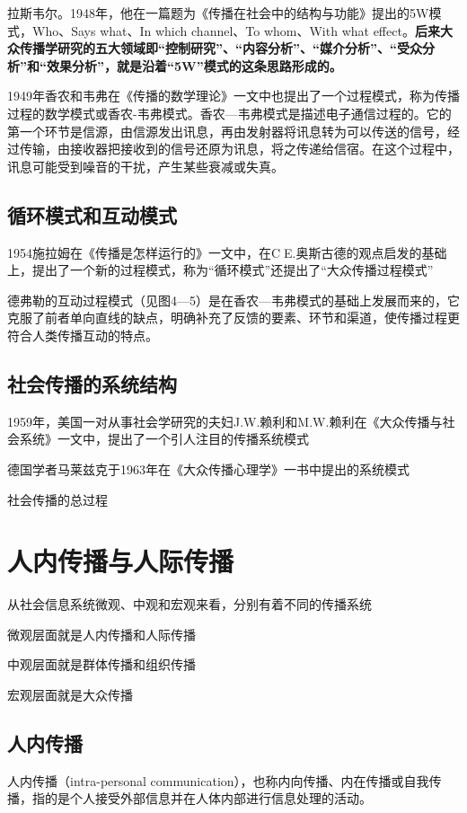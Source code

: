 \documentclass[UTF8,12pt]{ctexart}
\numberwithin{equation}{section} %
\numberwithin{figure}{section}
\numberwithin{table}{section}
\begin{document}
	拉斯韦尔。1948年，他在一篇题为《传播在社会中的结构与功能》提出的5W模式，Who、Says what、In which channel、To whom、With what effect。\textbf{后来大众传播学研究的五大领域即“控制研究”、“内容分析”、“媒介分析”、“受众分析”和“效果分析”，就是沿着“5W”模式的这条思路形成的。}
	
	1949年香农和韦弗在《传播的数学理论》一文中也提出了一个过程模式，称为传播过程的数学模式或香农-韦弗模式。香农—韦弗模式是描述电子通信过程的。它的第一个环节是信源，由信源发出讯息，再由发射器将讯息转为可以传送的信号，经过传输，由接收器把接收到的信号还原为讯息，将之传递给信宿。在这个过程中，讯息可能受到噪音的干扰，产生某些衰减或失真。
	
	\subsection{循环模式和互动模式}
	
	1954施拉姆在《传播是怎样运行的》一文中，在CE.奥斯古德的观点启发的基础上，提出了一个新的过程模式，称为“循环模式”还提出了“大众传播过程模式”
	
	德弗勒的互动过程模式（见图4—5）是在香农—韦弗模式的基础上发展而来的，它克服了前者单向直线的缺点，明确补充了反馈的要素、环节和渠道，使传播过程更符合人类传播互动的特点。
	
	
	\subsection{社会传播的系统结构}
	
	1959年，美国一对从事社会学研究的夫妇J.W.赖利和M.W.赖利在《大众传播与社会系统》一文中，提出了一个引人注目的传播系统模式
	
	德国学者马莱兹克于1963年在《大众传播心理学》一书中提出的系统模式
	
	社会传播的总过程
	
	\section{人内传播与人际传播}
	
	从社会信息系统微观、中观和宏观来看，分别有着不同的传播系统
	
	微观层面就是人内传播和人际传播
	
	中观层面就是群体传播和组织传播
	
	宏观层面就是大众传播
	
	\subsection{人内传播}
	人内传播（intra-personal communication），也称内向传播、内在传播或自我传播，指的是个人接受外部信息并在人体内部进行信息处理的活动。
	
\end{document}
